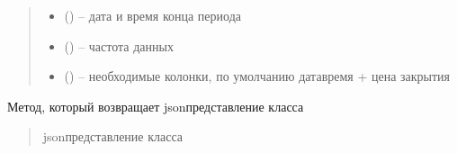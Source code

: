 \documentclass[letterpaper,10pt,english,openany,oneside]{sphinxmanual}
\begin{document}
\begin{fulllineitems}
\begin{fulllineitems}
\begin{quote}
\begin{description}
\begin{itemize}
\item {} 
\sphinxAtStartPar
{} (\sphinxstyleliteralemphasis{\sphinxupquote{{[}}}\sphinxstyleliteralemphasis{\sphinxupquote{{[}}}\sphinxstyleliteralemphasis{\sphinxupquote{, }}\sphinxstyleliteralemphasis{\sphinxupquote{{]}}}\sphinxstyleliteralemphasis{\sphinxupquote{{]}}}) – дата и время конца периода

\item {} 
\sphinxAtStartPar
{} (\sphinxstyleliteralemphasis{\sphinxupquote{{[}}}\sphinxstyleliteralemphasis{\sphinxupquote{{]}}}) – частота данных

\item {} 
\sphinxAtStartPar
{} (\sphinxstyleliteralemphasis{\sphinxupquote{{[}}}\sphinxstyleliteralemphasis{\sphinxupquote{{]}}}) – необходимые колонки, по умолчанию дата\sphinxhyphen{}время + цена закрытия

\end{itemize}

\end{description}\end{quote}

\end{fulllineitems}


\begin{fulllineitems}
\label{\detokenize{src.structures:src.structures.st_strategies.DataRequest.get_json}}
\pysigstartsignatures
{}
\pysigstopsignatures
\sphinxAtStartPar
Метод, который возвращает json\sphinxhyphen{}представление класса
\begin{quote}\begin{description}
\sphinxAtStartPar
json\sphinxhyphen{}представление класса

\end{description}\end{quote}

\end{fulllineitems}


\end{fulllineitems}
\end{document}
